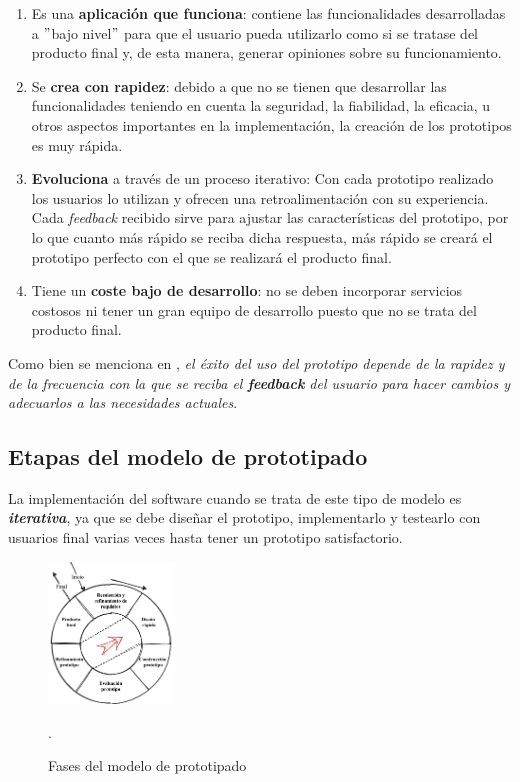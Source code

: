 \begin{enumerate}
    \item Es una \textbf{aplicación que funciona}: contiene las funcionalidades desarrolladas a $"$bajo nivel$"$ para que el usuario pueda utilizarlo como si se tratase del producto final y, de esta manera, generar opiniones sobre su funcionamiento.
    \item Se \textbf{crea con rapidez}: debido a que no se tienen que desarrollar las funcionalidades teniendo en cuenta la seguridad, la fiabilidad, la eficacia, u otros aspectos importantes en la implementación, la creación de los prototipos es muy rápida. 
    \item \textbf{Evoluciona} a través de un proceso iterativo:  Con cada prototipo realizado los usuarios lo utilizan y ofrecen una retroalimentación con su experiencia. Cada \textit{feedback} recibido sirve para ajustar las características del prototipo, por lo que cuanto más rápido se reciba dicha respuesta, más rápido se creará el prototipo perfecto con el que se realizará el producto final. 
    \item Tiene un \textbf{coste bajo de desarrollo}: no se deben incorporar servicios costosos ni tener un gran equipo de desarrollo puesto que no se trata del producto final. 
\end{enumerate}

Como bien se menciona en \cite{calameoModeloPrototipado}, \textit{el éxito del uso del prototipo depende de la rapidez y de la frecuencia con la que se reciba el \textbf{feedback} del usuario para hacer cambios y adecuarlos a las necesidades actuales}.

\subsection{Etapas del modelo de prototipado}

La implementación del software cuando se trata de este tipo de modelo es \textbf{\textit{iterativa}}, ya que se debe diseñar el prototipo, implementarlo y testearlo con usuarios final varias veces hasta tener un prototipo satisfactorio. \\

\begin{figure}[h]
    \centering
    \includegraphics[width=0.3\textwidth]{cap4_analisis_tecnico/images/modelo_prototipado.png}
    \caption{Fases del modelo de prototipado}.
    \label{fig:modelo_prototipado}
\end{figure}

